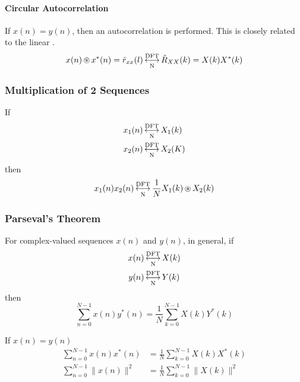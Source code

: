 \paragraph{Circular Autocorrelation}\label{par:DFT_Properties-Circular_Autocorrelation}
If $x(n) = y(n)$, then an autocorrelation is performed.
This is closely related to the linear .
\begin{equation}\label{eq:DFT_Properties-Circular_Autocorrelation}
  x(n) \operatorname{\circledast} x^{*}(n) = \tilde{r}_{xx}(l) \operatorname{\overset{\text{DFT}}{\underset{N}{\longleftrightarrow}}} \tilde{R}_{XX}(k) = X(k)X^{*}(k)
\end{equation}

\subsubsection{Multiplication of 2 Sequences}\label{subsubsec:DFT_Properties-2_Sequence_Multiplication}
If
\begin{align*}
  x_{1}(n) &\operatorname{\overset{\text{DFT}}{\underset{N}{\longleftrightarrow}}} X_{1}(k) \\
  x_{2}(n) &\operatorname{\overset{\text{DFT}}{\underset{N}{\longleftrightarrow}}} X_{2}(K)
\end{align*}
then
\begin{equation}\label{eq:2_Sequence_Multiplication}
  x_{1}(n)x_{2}(n) \operatorname{\overset{\text{DFT}}{\underset{N}{\longleftrightarrow}}} \frac{1}{N} X_{1}(k) \operatorname{\circledast} X_{2}(k)
\end{equation}

\subsubsection{Parseval's Theorem}\label{subsubsec:DFT_Properties-Parsevals_Theorem}
For complex-valued sequences $x(n)$ and $y(n)$, in general, if
\begin{align*}
  x(n) &\operatorname{\overset{\text{DFT}}{\underset{N}{\longleftrightarrow}}} X(k) \\
  y(n) &\operatorname{\overset{\text{DFT}}{\underset{N}{\longleftrightarrow}}} Y(k)
\end{align*}
then
\begin{equation}\label{eq:DFT_Properties-Parsevals_Theorem}
  \sum\limits_{n=0}^{N-1}x(n)y^{*}(n) = \frac{1}{N} \sum\limits_{k=0}^{N-1} X(k)Y^{*}(k)
\end{equation}

If $x(n) = y(n)$
\begin{equation}\label{eq:DFT_Properties-Parsevals_Theorem-Magnitude}
  \begin{aligned}
    \sum\limits_{n=0}^{N-1}x(n) x^{*}(n) &= \frac{1}{N} \sum\limits_{k=0}^{N-1} X(k)X^{*}(k) \\
    \sum\limits_{n=0}^{N-1} \lVert x(n) \rVert^{2} &= \frac{1}{N} \sum\limits_{k=0}^{N-1} \lVert X(k) \rVert^{2} \\
  \end{aligned}
\end{equation}

